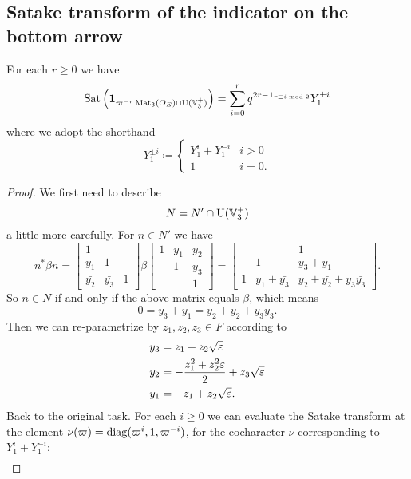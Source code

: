 \subsection{Satake transform of the indicator on the bottom arrow}
\begin{proposition}
  For each $r \ge 0$ we have
  \[ \operatorname{Sat}\left(\mathbf{1}_{\varpi^{-r} \operatorname{Mat}_3(O_E) \cap \operatorname{U}(\mathbb V_3^+)}\right)
    = \sum_{i=0}^r q^{2r - \mathbf{1}_{r \equiv i \bmod 2}} Y_1^{\pm i} \]
  where we adopt the shorthand
  \[
    Y_1^{\pm i} \coloneqq
    \begin{cases}
      Y_1^i + Y_1^{-i} & i > 0 \\
      1 & i = 0 .
    \end{cases}
  \]
\end{proposition}
\begin{proof}
  We first need to describe \[ N = N' \cap \operatorname{U}(\mathbb V_3^+) \] a little more carefully.
  For $n \in N'$ we have
  \[
    n^\ast \beta n
    =
    \begin{bmatrix} 1 \\ \bar{y_1} & 1 \\ \bar{y_2} & \bar{y_3} & 1 \end{bmatrix}
    \beta
    \begin{bmatrix}
      1 & y_1 & y_2 \\
        & 1 & y_3 \\
        & & 1
    \end{bmatrix}
    = \begin{bmatrix}
      & & 1 \\
      & 1 & y_3 + \bar{y_1} \\
      1 & y_1 + \bar{y_3} & y_2 + \bar{y_2} + y_3 \bar{y_3}
    \end{bmatrix}.
  \]
  So $n \in N$ if and only if the above matrix equals $\beta$, which means
  \[ 0 = y_3 + \bar{y_1} = y_2 + \bar{y_2} + y_3 \bar{y_3}. \]
  Then we can re-parametrize by $z_1, z_2, z_3 \in F$ according to
  \begin{align*}
    y_3 &= z_1 + z_2 \sqrt{\varepsilon} \\
    y_2 &= -\frac{z_1^2 + z_2^2 \varepsilon}{2} + z_3\sqrt{\varepsilon} \\
    y_1 &= -z_1 + z_2\sqrt{\varepsilon}.
  \end{align*}
  Back to the original task.
  For each $i \ge 0$ we can evaluate the Satake transform at the element
  $\nu(\varpi) = \operatorname{diag}(\varpi^i, 1, \varpi^{-i})$, for the cocharacter $\nu$
  corresponding to $Y_1^i + Y_1^{-i}$:
  \begin{align*}

\end{align*}
\end{proof}
